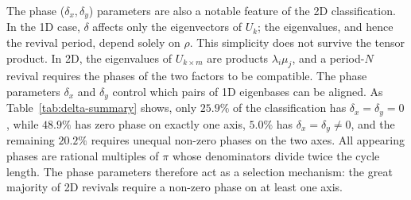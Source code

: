 The phase ($\delta_x, \delta_y$) parameters are also
a notable feature of the 2D
classification. In the 1D case, $\delta$ affects only the
eigenvectors of $U_k$; the eigenvalues, and hence the revival
period, depend solely on $\rho$. This simplicity does not
survive the tensor product. In 2D, the eigenvalues of
$U_{k \times m}$ are products $\lambda_i \mu_j$, and a
period-$N$ revival requires the phases of the two factors to
be compatible. The phase parameters $\delta_x$ and $\delta_y$
control which pairs of 1D eigenbases can be aligned. As
Table~\ref{tab:delta-summary} shows, only $25.9\%$ of the
 classification has $\delta_x = \delta_y = 0$, while
$48.9\%$ has zero phase on exactly one axis, $5.0\%$ has
$\delta_x = \delta_y \neq 0$, and the remaining $20.2\%$
requires unequal non-zero phases on the two axes. All
appearing phases are rational multiples of $\pi$ whose
denominators divide twice the cycle length. The phase
parameters therefore act as a selection mechanism: the great
majority of 2D revivals require a non-zero phase on at least
one axis.
